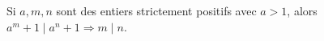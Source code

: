 Si $a, m, n$ sont des entiers strictement positifs avec $a > 1$, alors $a^m + 1 \mid a^n + 1 \Rightarrow m \mid n$.
